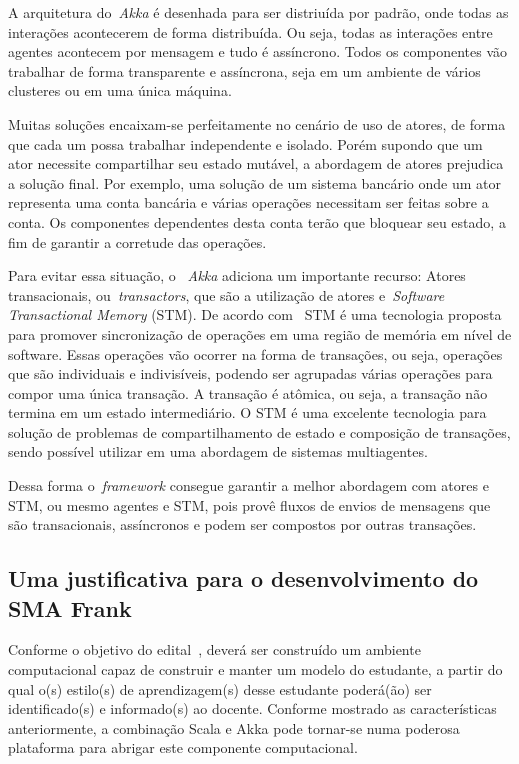 A arquitetura do~\emph{Akka} é desenhada para ser distriuída por padrão, onde todas as interações acontecerem de forma distribuída. Ou seja, todas as interações entre agentes acontecem por mensagem e tudo é assíncrono. Todos os componentes vão trabalhar de forma transparente e assíncrona, seja em um ambiente de vários clusteres ou em uma única máquina.

Muitas soluções encaixam-se perfeitamente no cenário de uso de atores, de forma que cada um possa trabalhar independente e isolado. Porém supondo que um ator necessite compartilhar seu estado mutável, a abordagem de atores prejudica a solução final. Por exemplo, uma solução de um sistema bancário onde um ator representa uma conta bancária e várias operações necessitam ser feitas sobre a conta. Os componentes dependentes desta conta terão que bloquear seu estado, a fim de garantir a corretude das operações.

Para evitar essa situação, o ~\emph{Akka} adiciona um importante recurso: Atores transacionais, ou~\emph{transactors}, que são a utilização de atores e~\emph{Software Transactional Memory} (STM). De acordo com~\cite{shavit97} STM é uma tecnologia proposta para promover sincronização de operações em uma região de memória em nível de software. Essas operações vão ocorrer na forma de transações, ou seja, operações que são individuais e indivisíveis, podendo ser agrupadas várias operações para compor uma única transação. A transação é atômica, ou seja, a transação não termina em um estado intermediário. O STM é uma excelente tecnologia para solução de problemas de compartilhamento de estado e composição de transações, sendo possível utilizar em uma abordagem de sistemas multiagentes.

Dessa forma o~\emph{framework} consegue garantir a melhor abordagem com atores e STM, ou mesmo agentes e STM, pois provê fluxos de envios de mensagens que são transacionais, assíncronos e podem ser compostos por outras transações.

\subsection{Uma justificativa para o desenvolvimento do SMA Frank}
Conforme o objetivo do edital~\cite{editalFrank}, deverá ser construído um ambiente computacional capaz de construir e manter um modelo do estudante, a partir do qual o(s) estilo(s) de aprendizagem(s) desse estudante poderá(ão) ser identificado(s) e informado(s) ao docente. Conforme mostrado as características anteriormente, a combinação Scala e Akka pode tornar-se numa poderosa plataforma para abrigar este componente computacional.

